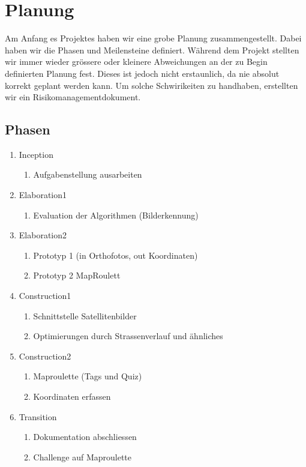 \section{Planung}
Am Anfang es Projektes haben wir eine grobe Planung zusammengestellt. Dabei haben wir die Phasen und Meilensteine definiert. Während dem Projekt stellten wir immer wieder grössere oder kleinere Abweichungen an der zu Begin definierten Planung fest. Dieses ist jedoch nicht erstaunlich, da nie absolut korrekt geplant werden kann. Um solche Schwirikeiten zu handhaben, erstellten wir ein Risikomanagementdokument.

\subsection{Phasen}
\begin{enumerate}
  \item Inception
  \begin{enumerate}
    \item Aufgabenstellung ausarbeiten
  \end{enumerate}
  \item Elaboration1
  \begin{enumerate}
    \item Evaluation der Algorithmen (Bilderkennung)
  \end{enumerate}
  \item Elaboration2
  \begin{enumerate}
    \item Prototyp 1 (in Orthofotos, out Koordinaten)
    \item Prototyp 2 MapRoulett
  \end{enumerate}
  \item Construction1
  \begin{enumerate}
    \item Schnittstelle Satellitenbilder
    \item Optimierungen durch Strassenverlauf und ähnliches
  \end{enumerate}
  \item Construction2
  \begin{enumerate}
    \item Maproulette (Tags und Quiz)
    \item Koordinaten erfassen	
  \end{enumerate}
  \item Transition
  \begin{enumerate}
    \item Dokumentation abschliessen
    \item Challenge auf Maproulette
  \end{enumerate}
\end{enumerate}

